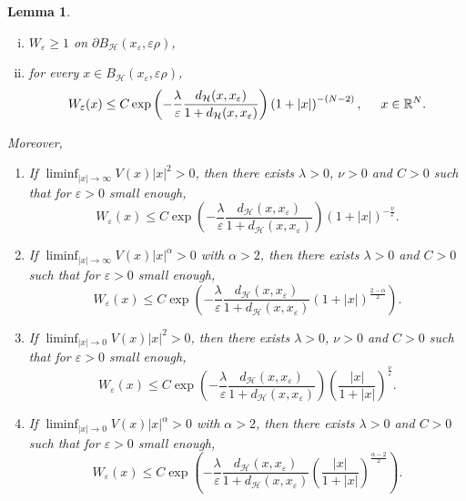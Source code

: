 \documentclass[a4paper]{amsart}
\newtheorem{lemma}[proposition]{Lemma}
\begin{document}
\begin{lemma}
\begin{enumerate}[(i)]
 \item \label{barrierc} $W_{\varepsilon}\geq 1$ on $\partial B_\mathcal{H}(x_{\varepsilon},\varepsilon \rho)$,
\item \label{barrierd} for every $x \in B_\mathcal{H}(x_{\varepsilon},\varepsilon \rho)$,
\[
 W_{\varepsilon}(x) \leq C \exp{\left( -\frac{\lambda}{\varepsilon} \frac{d_{\mathcal{H}}(x, x_\varepsilon)}{1+d_{\mathcal{H}}(x,
x_\varepsilon)}\right)}
\left( 1+{\left| {x} \right|} \right)^{-(N-2)}, \hspace{0.5cm} x \in {\mathbb{R}}^N. 
\]
 \end{enumerate}
Moreover,
\begin{enumerate}[(1)]
\item \label{Wepsiloninfinityquadratic} If $\liminf_{{\left| {x} \right|}\rightarrow\infty} V(x){\left| {x} \right|}^{2} > 0$, then there exists
$\lambda > 0$, $\nu > 0$ and $C > 0$ such that for $\varepsilon > 0$ small enough, 
\[
  W_\varepsilon (x) \leq C \exp{\left( -\frac{\lambda}{\varepsilon} \frac{d_{\mathcal{H}}(x, x_\varepsilon)}{1+d_{\mathcal{H}}(x,
x_\varepsilon)}\right)}
\left( 1+{\left| {x} \right|} \right)^{-\frac{\nu}{\varepsilon}}.
\]
\item \label{WepsiloninfinitySuperquadratic} If $\liminf_{{\left| {x} \right|}\rightarrow\infty} V(x){\left| {x} \right|}^{\alpha} > 0$ with
$\alpha > 2$, then there exists $\lambda > 0$ and $C > 0$ such that for $\varepsilon > 0$ small enough, 
\[
W_\varepsilon (x) \leq C\exp \left(-\frac{\lambda}{\varepsilon}\frac{d_{\mathcal{H}}(x, x_\varepsilon)}{1+d_\mathcal{H}(x,
x_\varepsilon)}(1+{\left| {x} \right|})^\frac{2-\alpha}{2}\right).
\]
\item \label{Wepsilon0quadratic} If $\liminf_{{\left| {x} \right|}\rightarrow 0} V(x){\left| {x} \right|}^{2} > 0$, then there exists $\lambda >
0$, $\nu > 0$ and $C > 0$ such that for $\varepsilon > 0$ small enough, 
\[
  W_\varepsilon (x) \leq C \exp{\left( -\frac{\lambda}{\varepsilon} \frac{d_{\mathcal{H}}(x, x_\varepsilon)}{1+d_{\mathcal{H}}(x,
x_\varepsilon)}\right)}
\left( \frac{{\left| {x} \right|}}{1+{\left| {x} \right|}}  \right)^{\frac{\nu}{\varepsilon}}.
\]
\item \label{Wepsilon0Superquadratic}If $\liminf_{{\left| {x} \right|}\rightarrow 0} V(x){\left| {x} \right|}^{\alpha} > 0$ with $\alpha >
2$, 
then there exists $\lambda > 0$ and $C > 0$ such that for $\varepsilon > 0$ small enough, 
\[
  W_\varepsilon (x) \leq C\exp \left(-\frac{\lambda}{\varepsilon}\frac{d_{\mathcal{H}}(x, x_\varepsilon)}{1+d_\mathcal{H}(x,
x_\varepsilon)}\left(\frac{{\left| {x} \right|}}{1+{\left| {x} \right|}}\right)^\frac{\alpha-2}{2}\right).
\]
\end{enumerate}
\end{lemma}
\end{document}
